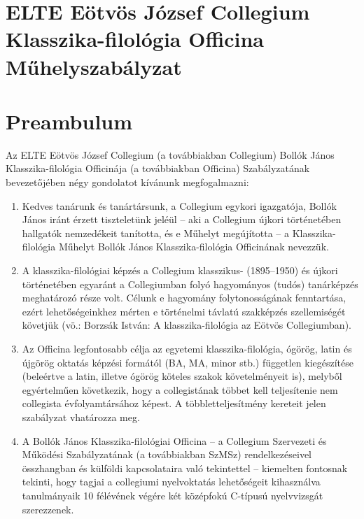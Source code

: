 \documentclass{rulebook}
\begin{document}
\section*{ELTE Eötvös József Collegium \\ Klasszika-filológia Officina\\ \vspace{0.5em} Műhelyszabályzat} 

\vspace{2em}

\section*{Preambulum}

Az ELTE Eötvös József Collegium (a továbbiakban Collegium) Bollók János Klasszika-filológia Officinája (a továbbiakban Officina) Szabályzatának bevezetőjében négy gondolatot kívánunk megfogalmazni:

\begin{enumerate}[label=\Roman*.]
\item Kedves tanárunk és tanártársunk, a Collegium egykori igazgatója, Bollók János iránt érzett tiszteletünk jeléül – aki a Collegium újkori történetében hallgatók nemzedékeit tanította, és e Műhelyt megújította – a Klasszika-filológia Műhelyt Bollók János Klasszika-filológia Officinának nevezzük.
\item A klasszika-filológiai képzés a Collegium klasszikus- (1895–1950) és újkori történetében egyaránt a Collegiumban folyó hagyományos (tudós) tanárképzés meghatározó része volt. Célunk e hagyomány folytonosságának fenntartása, ezért lehetőségeinkhez mérten e történelmi távlatú szakképzés szellemiségét követjük (vö.: Borzsák István: A klasszika-filológia az Eötvös Collegiumban).
\item Az Officina legfontosabb célja az egyetemi klasszika-filológia, ógörög, latin és újgörög oktatás képzési formától (BA, MA, minor stb.) független kiegészítése (beleértve a latin, illetve ógörög köteles szakok követelményeit is), melyből egyértelműen következik, hogy a collegistának többet kell teljesítenie nem collegista évfolyamtársához képest. A többletteljesítmény kereteit jelen szabályzat vhatározza meg.
\item A Bollók János Klasszika-filológiai Officina -- a Collegium Szervezeti és Működési Szabályzatának (a továbbiakban SzMSz) rendelkezéseivel összhangban és külföldi kapcsolataira való tekintettel -- kiemelten fontosnak tekinti, hogy tagjai a collegiumi nyelvoktatás lehetőségeit kihasználva tanulmányaik 10 félévének végére két középfokú C-típusú nyelvvizsgát szerezzenek.
	
\end{enumerate}
\end{document}
